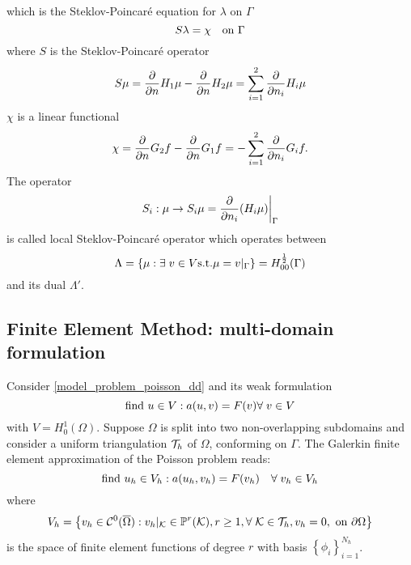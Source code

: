 which is the Steklov-Poincaré equation for \(\lambda\) on \(\Gamma\)
\[
    S\lambda = \chi \quad \text{on }\Gamma
\]
where \(S\) is the Steklov-Poincaré operator 
\[
    S\mu = \pderivative{n}H_1 \mu - \pderivative{n}H_2\mu = \sum_{i=1}^{2}\pderivative{n_i} H_i\mu
\]
\(\chi\) is a linear functional 
\[
    \chi = \pderivative{n} G_2 f -\pderivative{n}G_1 f = -\sum_{i=1}^{2} \pderivative{n_i} G_i f.
\]
The operator 
\[
    S_i : \mu \to S_i\mu = {\pderivative{n_i}(H_i\mu)}\bigg\vert_\Gamma
\]
is called local Steklov-Poincaré operator which operates between 
\[
    \Lambda = \left\{ \mu : \exists \; v \in V \text{s.t.} \mu = v\vert_{\Gamma} \right\} = H^{\frac{1}{2}}_{00}(\Gamma)
\]
and its dual \(\Lambda'\).
\subsection{Finite Element Method: multi-domain formulation}
Consider \eqref{model_problem_poisson_dd} and its weak formulation 
\[
    \text{find } u \in V: a(u,v) = F(v) \forall \; v \in V
\]
with \(V = H^1_0(\Omega)\). Suppose \(\Omega\) is split into two non-overlapping subdomains and consider a uniform triangulation \(\mathcal{T}_h\) of \(\Omega\), conforming on \(\Gamma\). 
The Galerkin finite element approximation of the Poisson problem reads:
\[
    \text{find } u_h \in V_h : a(u_h, v_h) = F(v_h) \quad \forall \; v_h \in V_h 
\]
where 
\[
    V_h = \left\{ v_h \in \mathcal{C}^0(\overline{\Omega}) : v_h\vert_{\mathcal{K}} \in \mathbb{P}^r(\mathcal{K}), r\geq 1, \forall \; {\mathcal{K}\in\mathcal{T}_h}, v_h = 0, \text{ on }{\partial\Omega} \right\}
\]
is the space of finite element functions of degree \(r\) with basis \(\left\{ \phi_i \right\}_{i=1}^{N_h}\).

